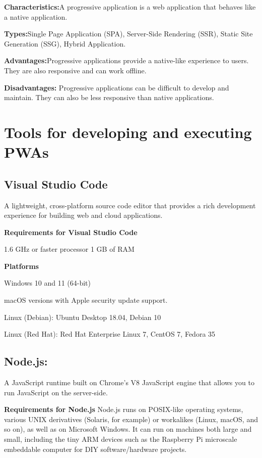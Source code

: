 \documentclass{article}
\begin{document}
	\begin{flushleft}
		\textbf{Characteristics:}A progressive application is a web application that behaves like a native application.
		
		\textbf{Types:}Single Page Application (SPA), Server-Side Rendering (SSR), Static Site Generation (SSG), Hybrid Application.
		
		\textbf{Advantages:}Progressive applications provide a native-like experience to users. They are also responsive and can work offline.
		
		\textbf{Disadvantages:}	Progressive applications can be difficult to develop and maintain. They can also be less responsive than native applications.
	\end{flushleft}
	\section{Tools for developing and executing PWAs}
			\subsection{Visual Studio Code}
			A lightweight, cross-platform source code editor that provides a rich development experience for building web and cloud applications.
			
\textbf{Requirements for Visual Studio Code}

1.6 GHz or faster processor
1 GB of RAM

\textbf{Platforms}


Windows 10 and 11 (64-bit)

macOS versions with Apple security update support.

Linux (Debian): Ubuntu Desktop 18.04, Debian 10

Linux (Red Hat): Red Hat Enterprise Linux 7, CentOS 7, Fedora 35

\subsection{Node.js:}
A JavaScript runtime built on Chrome’s V8 JavaScript engine that allows you to run JavaScript on the server-side.

\textbf{Requirements for Node.js}
Node.js runs on POSIX-like operating systems, various UNIX derivatives (Solaris, for example) or workalikes (Linux, macOS, and so on), as well as on Microsoft Windows. It can run on machines both large and small, including the tiny ARM devices such as the Raspberry Pi microscale embeddable computer for DIY software/hardware projects.
\end{document}
